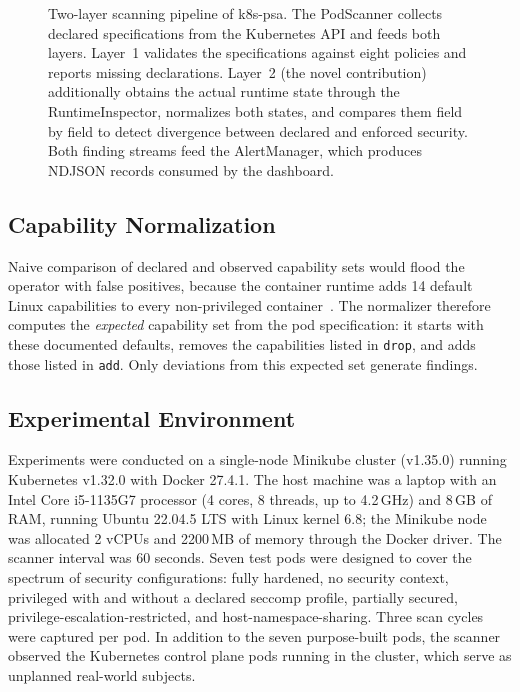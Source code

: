 \documentclass[sigconf]{acmart}
\begin{document}
\begin{figure}[htbp]
{%
}
\caption{Two-layer scanning pipeline of k8s-psa. The PodScanner collects declared specifications from the Kubernetes API and feeds both layers. Layer~1 validates the specifications against eight policies and reports missing declarations. Layer~2 (the novel contribution) additionally obtains the actual runtime state through the RuntimeInspector, normalizes both states, and compares them field by field to detect divergence between declared and enforced security. Both finding streams feed the AlertManager, which produces NDJSON records consumed by the dashboard.}
\label{fig:pipeline}
\end{figure}

\subsection{Capability Normalization}

Naive comparison of declared and observed capability sets would flood the operator with false positives, because the container runtime adds 14 default Linux capabilities to every non-privileged container~\cite{dockerseccomp2024}. The normalizer therefore computes the \emph{expected} capability set from the pod specification: it starts with these documented defaults, removes the capabilities listed in \texttt{drop}, and adds those listed in \texttt{add}. Only deviations from this expected set generate findings.

\subsection{Experimental Environment}
\label{sec:env}

Experiments were conducted on a single-node Minikube cluster (v1.35.0) running Kubernetes v1.32.0 with Docker 27.4.1. The host machine was a laptop with an Intel Core i5-1135G7 processor (4 cores, 8 threads, up to 4.2\,GHz) and 8\,GB of RAM, running Ubuntu 22.04.5 LTS with Linux kernel 6.8; the Minikube node was allocated 2 vCPUs and 2200\,MB of memory through the Docker driver. The scanner interval was 60 seconds. Seven test pods were designed to cover the spectrum of security configurations: fully hardened, no security context, privileged with and without a declared seccomp profile, partially secured, privilege-escalation-restricted, and host-namespace-sharing. Three scan cycles were captured per pod. In addition to the seven purpose-built pods, the scanner observed the Kubernetes control plane pods running in the cluster, which serve as unplanned real-world subjects.
\end{document}
